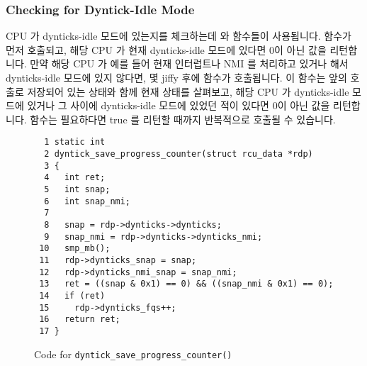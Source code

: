 \subsubsection{Checking for Dyntick-Idle Mode}
\label{app:rcuimpl:rcutreewt:Checking for Dyntick-Idle Mode}

CPU 가 dynticks-idle 모드에 있는지를 체크하는데
 와 
함수들이 사용됩니다.
 함수가 먼저 호출되고, 해당 CPU 가 현재
dynticks-idle 모드에 있다면 0이 아닌 값을 리턴합니다.
만약 해당 CPU 가 예를 들어 현재 인터럽트나 NMI 를 처리하고 있거나 해서
dynticks-idle 모드에 있지 않다면, 몇 jiffy 후에 
함수가 호출됩니다.
이 함수는 앞의  호출로 저장되어 있는 상태와
함께 현재 상태를 살펴보고, 해당 CPU 가 dynticks-idle 모드에 있거나 그 사이에
dynticks-idle 모드에 있었던 적이 있다면 0이 아닌 값을 리턴합니다.
 함수는 필요하다면 true 를 리턴할 때까지
반복적으로 호출될 수 있습니다.
\iffalse

The \co{dyntick_save_progress_counter()} and
\co{rcu_implicit_dynticks_qs()} functions are used to check
whether a CPU is in dynticks-idle mode.
The \co{dyntick_save_progress_counter()} function is invoked first,
and returns non-zero if the CPU is currently in dynticks-idle mode.
If the CPU was not in dynticks-idle mode, for example, because it is
currently handling an interrupt or NMI, then the
\co{rcu_implicit_dynticks_qs()} function is called some jiffies later.
This function looks at the current state in conjunction with state
stored away by the earlier call to \co{dyntick_save_progress_counter()},
again returning non-zero if the CPU either is in dynticks-idle mode or
was in dynticks-idle mode during the intervening time.
The \co{rcu_implicit_dynticks_qs()} function may be invoked repeatedly,
if need be, until it returns true.
\fi

\begin{figure}[tbp]
{ \scriptsize
\begin{verbatim}
  1 static int
  2 dyntick_save_progress_counter(struct rcu_data *rdp)
  3 {
  4   int ret;
  5   int snap;
  6   int snap_nmi;
  7
  8   snap = rdp->dynticks->dynticks;
  9   snap_nmi = rdp->dynticks->dynticks_nmi;
 10   smp_mb();
 11   rdp->dynticks_snap = snap;
 12   rdp->dynticks_nmi_snap = snap_nmi;
 13   ret = ((snap & 0x1) == 0) && ((snap_nmi & 0x1) == 0);
 14   if (ret)
 15     rdp->dynticks_fqs++;
 16   return ret;
 17 }
\end{verbatim}
}
\caption{Code for {\tt dyntick\_\-save\_\-progress\_\-counter()}}
\label{fig:app:rcuimpl:rcutreewt:Code for dyntick-save-progress-counter}
\end{figure}

